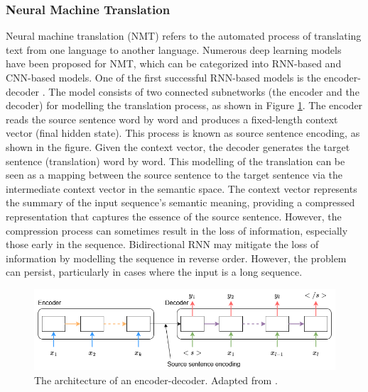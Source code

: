 \documentclass[preprint,12pt]{elsarticle}
\begin{document}
\begin{center}
\begin{table}
\begin{tabular}{|p{1cm} | p{6.5cm} | p{6.5cm}|}
 \hline
\end{tabular}
\label{table_summary_textclf_studies}
\end{table}
\end{center}

\subsubsection{Neural Machine Translation}

Neural machine translation (NMT) refers to the automated process of translating text from one language to another language. Numerous deep learning models have been proposed for NMT, which can be categorized into RNN-based and CNN-based models. One of the first successful RNN-based models is the encoder-decoder \citep{cho_learning_2014, sutskever_sequence_2014}. The model consists of two connected subnetworks (the encoder and the decoder) for modelling the translation process, as shown in Figure \ref{fig_nmt_encoder_decoder}. The encoder reads the source sentence word by word and produces a fixed-length context vector (final hidden state). This process is known as source sentence encoding, as shown in the figure. Given the context vector, the decoder generates the target sentence (translation) word by word. This modelling of the translation can be seen as a mapping between the source sentence to the target sentence via the intermediate context vector in the semantic space. The context vector represents the summary of the input sequence’s semantic meaning, providing a compressed representation that captures the essence of the source sentence. However, the compression process can sometimes result in the loss of information, especially those early in the sequence. Bidirectional RNN may mitigate the loss of information by modelling the sequence in reverse order. However, the problem can persist, particularly in cases where the input is a long sequence.

\begin{figure}[h!]
    \centering
    \includegraphics[scale=0.45]{fig_nmt_encoder-decoder.png}
    \caption{The architecture of an encoder-decoder. Adapted from \citep{stahlberg_neural_2020}.}
    \label{fig_nmt_encoder_decoder}
\end{figure}
\end{document}
